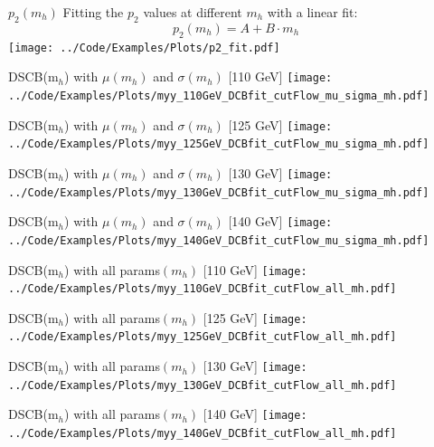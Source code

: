 \documentclass[10pt,UKenglish, leqno, xcolor = dvipsnames]{beamer}
\begin{document}
		\begin{frame}{$p_2(m_h)$}
			\vfill
			Fitting the $p_2$ values at different $m_h$ with a linear fit:
			$$
			p_2(m_h)=A+B\cdot m_h
			$$
			\centering
			\texttt{[image: ../Code/Examples/Plots/p2\_fit.pdf]}
			\vfill
		\end{frame}
	
		\begin{frame}{DSCB(m$_{h}$) with $\mu(m_h)$ and $\sigma(m_h)$ [110 GeV]}
			\vfill
			\texttt{[image: ../Code/Examples/Plots/myy\_110GeV\_DCBfit\_cutFlow\_mu\_sigma\_mh.pdf]}
			\vfill
		\end{frame}
	
		\begin{frame}{DSCB(m$_{h}$) with $\mu(m_h)$ and $\sigma(m_h)$ [125 GeV]}
			\vfill
			\texttt{[image: ../Code/Examples/Plots/myy\_125GeV\_DCBfit\_cutFlow\_mu\_sigma\_mh.pdf]}
			\vfill
		\end{frame}

		\begin{frame}{DSCB(m$_{h}$) with $\mu(m_h)$ and $\sigma(m_h)$ [130 GeV]}
			\vfill
			\texttt{[image: ../Code/Examples/Plots/myy\_130GeV\_DCBfit\_cutFlow\_mu\_sigma\_mh.pdf]}
			\vfill
		\end{frame}	
	
		\begin{frame}{DSCB(m$_{h}$) with $\mu(m_h)$ and $\sigma(m_h)$ [140 GeV]}
			\vfill
			\texttt{[image: ../Code/Examples/Plots/myy\_140GeV\_DCBfit\_cutFlow\_mu\_sigma\_mh.pdf]}
			\vfill
		\end{frame}
	
		\begin{frame}{DSCB(m$_{h}$) with all params$(m_h)$ [110 GeV]}
			\vfill
			\texttt{[image: ../Code/Examples/Plots/myy\_110GeV\_DCBfit\_cutFlow\_all\_mh.pdf]}
			\vfill
		\end{frame}
	
		\begin{frame}{DSCB(m$_{h}$) with all params$(m_h)$ [125 GeV]}
			\vfill
			\texttt{[image: ../Code/Examples/Plots/myy\_125GeV\_DCBfit\_cutFlow\_all\_mh.pdf]}
			\vfill
		\end{frame}
	
		\begin{frame}{DSCB(m$_{h}$) with all params$(m_h)$ [130 GeV]}
			\vfill
			\texttt{[image: ../Code/Examples/Plots/myy\_130GeV\_DCBfit\_cutFlow\_all\_mh.pdf]}
			\vfill
		\end{frame}
	
		\begin{frame}{DSCB(m$_{h}$) with all params$(m_h)$ [140 GeV]}
			\vfill
			\texttt{[image: ../Code/Examples/Plots/myy\_140GeV\_DCBfit\_cutFlow\_all\_mh.pdf]}
			\vfill
		\end{frame}
	
\end{document}
